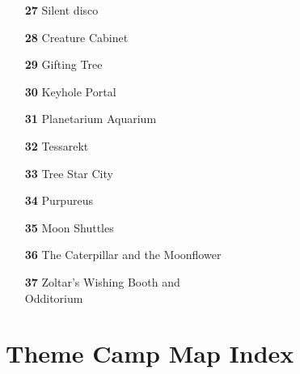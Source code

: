 \begin{multicols}{2}
\begin{itemize}[noitemsep]
	\item[\textbf{27}] Silent disco
	\item[\textbf{28}] Creature Cabinet
	\item[\textbf{29}] Gifting Tree
	\item[\textbf{30}] Keyhole Portal
	\item[\textbf{31}] Planetarium Aquarium
	\item[\textbf{32}] Tessarekt
	\item[\textbf{33}] Tree Star City
	\item[\textbf{34}] Purpureus
	\item[\textbf{35}] Moon Shuttles
	\item[\textbf{36}] The Caterpillar and the Moonflower
	\item[\textbf{37}] Zoltar's Wishing Booth and\\
	Odditorium
\end{itemize}
\end{multicols}

\clearpage

\section*{Theme Camp Map Index}

